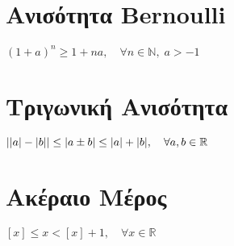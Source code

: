 {    \section{Ανισότητα Bernoulli}
    \begin{myitemize}
      \item $(1+a)^{n} \geq 1+ na, \quad \forall n \in \mathbb{N}, \; a>-1 $
    \end{myitemize}
    \section{Τριγωνική Ανισότητα}
    \begin{myitemize}
      \item $ \abs{\abs{a} - \abs{b}} \leq \abs{a \pm b} \leq \abs{a} + \abs{b}, \quad 
        \forall a,b \in \mathbb{R} $
    \end{myitemize}
    \section{Ακέραιο Μέρος}
    \begin{myitemize}
      \item $ [x] \leq x < [x]+1, \quad \forall x \in \mathbb{R} $ 
    \end{myitemize}
  }



